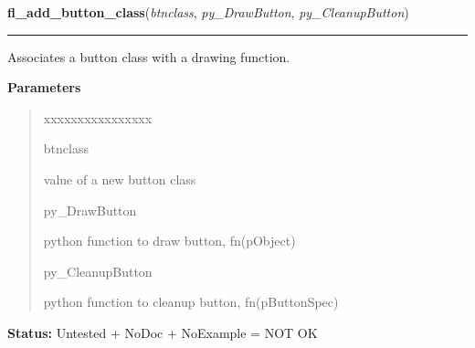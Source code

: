     \label{xformslib:library:fl_add_button_class}

    \vspace{0.5ex}

\hspace{.8\funcindent}\begin{boxedminipage}{\funcwidth}

    \raggedright \textbf{fl\_add\_button\_class}(\textit{btnclass}, \textit{py\_DrawButton}, \textit{py\_CleanupButton})

    \vspace{-1.5ex}

    \rule{\textwidth}{0.5\fboxrule}
\setlength{\parskip}{2ex}
    Associates a button class with a drawing function.

\setlength{\parskip}{1ex}
      \textbf{Parameters}
      \vspace{-1ex}

      \begin{quote}
        \begin{Ventry}{xxxxxxxxxxxxxxxx}

          \item[btnclass]

          value of a new button class

          \item[py\_DrawButton]

          python function to draw button, fn(pObject)

          \item[py\_CleanupButton]

          python function to cleanup button, fn(pButtonSpec)

        \end{Ventry}

      \end{quote}

\textbf{Status:} Untested + NoDoc + NoExample = NOT OK



    \end{boxedminipage}

    \label{xformslib:library:fl_set_button_mouse_buttons}

    \vspace{0.5ex}

